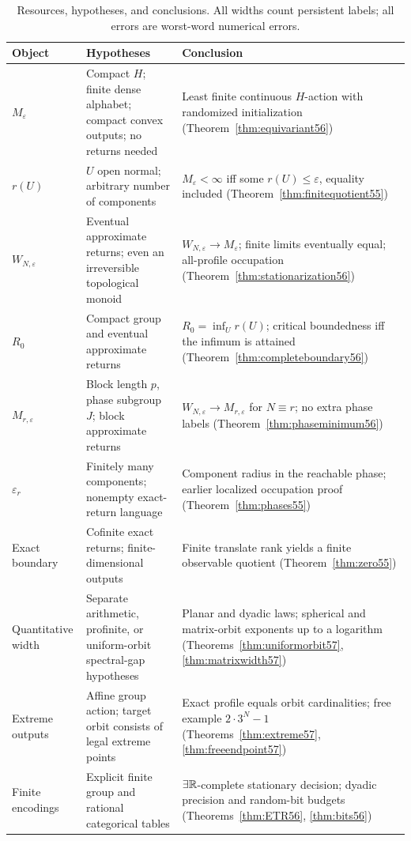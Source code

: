 \clearpage
\begin{table}[p]
\centering\small
\caption{Resources, hypotheses, and conclusions. All widths count persistent labels; all errors are worst-word numerical errors.}\label{tab:map56}
\begin{tabular}{p{}p{}p{}}
\toprule
Object & Hypotheses & Conclusion\\
\midrule
$M_\varepsilon$ & Compact $H$; finite dense alphabet; compact convex outputs; no returns needed & Least finite continuous $H$-action with randomized initialization (Theorem~\ref{thm:equivariant56})\\[3pt]
$r(U)$ & $U$ open normal; arbitrary number of components & $M_\varepsilon<\infty$ iff some $r(U)\le\varepsilon$, equality included (Theorem~\ref{thm:finitequotient55})\\[3pt]
$W_{N,\varepsilon}$ & Eventual approximate returns; even an irreversible topological monoid & $W_{N,\varepsilon}\to M_\varepsilon$; finite limits eventually equal; all-profile occupation (Theorem~\ref{thm:stationarization56})\\[3pt]
$R_0$ & Compact group and eventual approximate returns & $R_0=\inf_Ur(U)$; critical boundedness iff the infimum is attained (Theorem~\ref{thm:completeboundary56})\\[3pt]
$M_{r,\varepsilon}$ & Block length $p$, phase subgroup $J$; block approximate returns & $W_{N,\varepsilon}\to M_{r,\varepsilon}$ for $N\equiv r$; no extra phase labels (Theorem~\ref{thm:phaseminimum56})\\[3pt]
$\varepsilon_r$ & Finitely many components; nonempty exact-return language & Component radius in the reachable phase; earlier localized occupation proof (Theorem~\ref{thm:phases55})\\[3pt]
Exact boundary & Cofinite exact returns; finite-dimensional outputs & Finite translate rank yields a finite observable quotient (Theorem~\ref{thm:zero55})\\[3pt]
Quantitative width & Separate arithmetic, profinite, or uniform-orbit spectral-gap hypotheses & Planar and dyadic laws; spherical and matrix-orbit exponents up to a logarithm (Theorems~\ref{thm:uniformorbit57}, \ref{thm:matrixwidth57})\\[3pt]
Extreme outputs & Affine group action; target orbit consists of legal extreme points & Exact profile equals orbit cardinalities; free example $2\cdot3^N-1$ (Theorems~\ref{thm:extreme57}, \ref{thm:freeendpoint57})\\[3pt]
Finite encodings & Explicit finite group and rational categorical tables & $\exists\mathbb R$-complete stationary decision; dyadic precision and random-bit budgets (Theorems~\ref{thm:ETR56}, \ref{thm:bits56})\\
\bottomrule
\end{tabular}
\end{table}
\clearpage
